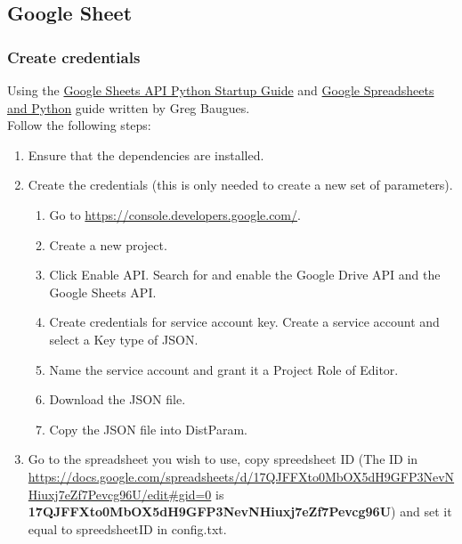 \documentclass[12pt]{article}
\begin{document}
\subsection{Google Sheet}
\subsubsection{Create credentials}
Using the \href{https://developers.google.com/sheets/api/quickstart/python}{Google Sheets API Python Startup Guide} and  \href{https://www.twilio.com/blog/2017/02/an-easy-way-to-read-and-write-to-a-google-spreadsheet-in-python.html?utm_source=youtube&utm_medium=video&utm_campaign=youtube_python_google_sheets}{Google Spreadsheets and Python} guide written by Greg Baugues.\\

Follow the following steps:\\
\begin{enumerate}
	\item Ensure that the dependencies are installed.\\
	\item Create the credentials (this is only needed to create a new set of parameters).
	\begin{enumerate}
		\item Go to \href{https://console.developers.google.com/}{https://console.developers.google.com/}.
		\item Create a new project.
		\item Click Enable API. Search for and enable the Google Drive API and the Google Sheets API.
		\item Create credentials for service account key.  Create a service account and select a Key type of JSON.  
		\item Name the service account and grant it a Project Role of Editor.
		\item Download the JSON file.
		\item Copy the JSON file into DistParam.
	\end{enumerate}
	\item Go to the spreadsheet you wish to use, copy spreedsheet ID (The ID in  \url{https://docs.google.com/spreadsheets/d/17QJFFXto0MbOX5dH9GFP3NevNHiuxj7eZf7Pevcg96U/edit#gid=0} is \textbf{17QJFFXto0MbOX5dH9GFP3NevNHiuxj7eZf7Pevcg96U}) and set it equal to spreedsheetID in config.txt.
\end{enumerate}
\end{document}
